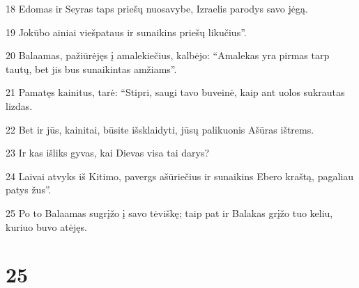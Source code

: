 \par 18 Edomas ir Seyras taps priešų nuosavybe, Izraelis parodys savo jėgą. 
\par 19 Jokūbo ainiai viešpataus ir sunaikins priešų likučius”. 
\par 20 Balaamas, pažiūrėjęs į amalekiečius, kalbėjo: “Amalekas yra pirmas tarp tautų, bet jis bus sunaikintas amžiams”. 
\par 21 Pamatęs kainitus, tarė: “Stipri, saugi tavo buveinė, kaip ant uolos sukrautas lizdas. 
\par 22 Bet ir jūs, kainitai, būsite išsklaidyti, jūsų palikuonis Ašūras ištrems. 
\par 23 Ir kas išliks gyvas, kai Dievas visa tai darys? 
\par 24 Laivai atvyks iš Kitimo, pavergs ašūriečius ir sunaikins Ebero kraštą, pagaliau patys žus”. 
\par 25 Po to Balaamas sugrįžo į savo tėviškę; taip pat ir Balakas grįžo tuo keliu, kuriuo buvo atėjęs.



\chapter{25}


